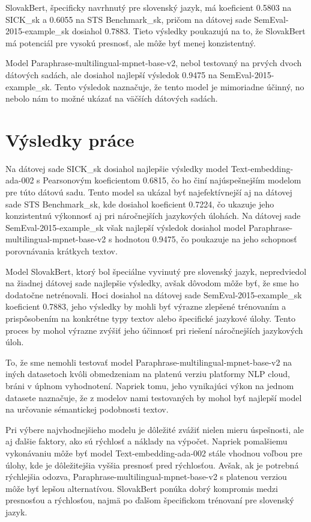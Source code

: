 \noindent
SlovakBert, špecificky navrhnutý pre slovenský jazyk, má koeficient 0.5803 na SICK\_sk a 0.6055 na STS Benchmark\_sk, pričom na dátovej sade SemEval-2015-example\_sk dosiahol 0.7883. Tieto výsledky poukazujú na to, že SlovakBert má potenciál pre vysokú presnosť, ale môže byť menej konzistentný.
\vspace{1em}

\noindent
Model Paraphrase-multilingual-mpnet-base-v2, nebol testovaný na prvých dvoch dátových sadách, ale dosiahol najlepší výsledok 0.9475 na SemEval-2015-example\_sk. Tento výsledok naznačuje, že tento model je mimoriadne účinný, no nebolo nám to možné ukázať na väčších dátových sadách.

\section{Výsledky práce}

Na dátovej sade SICK\_sk dosiahol najlepšie výsledky model Text-embedding-ada-002 s Pearsonovým koeficientom 0.6815, čo ho činí najúspešnejším modelom pre túto dátovú sadu. Tento model sa ukázal byť najefektívnejší aj na dátovej sade STS Benchmark\_sk, kde dosiahol koeficient 0.7224, čo ukazuje jeho konzistentnú výkonnosť aj pri náročnejších jazykových úlohách. Na dátovej sade SemEval-2015-example\_sk však najlepší výsledok dosiahol model Paraphrase-multilingual-mpnet-base-v2 s hodnotou 0.9475, čo poukazuje na jeho schopnosť porovnávania krátkych textov.
\vspace{1em}

\noindent
Model SlovakBert, ktorý bol špeciálne vyvinutý pre slovenský jazyk, nepredviedol na žiadnej dátovej sade najlepšie výsledky, avšak dôvodom môže byť, že sme ho dodatočne netrénovali. Hoci dosiahol na dátovej sade SemEval-2015-example\_sk koeficient 0.7883, jeho výsledky by mohli byť výrazne zlepšené trénovaním a prispôsobením na konkrétne typy textov alebo špecifické jazykové úlohy. Tento proces by mohol výrazne zvýšiť jeho účinnosť pri riešení náročnejších jazykových úloh.
\vspace{1em}

\noindent
To, že sme nemohli testovať model Paraphrase-multilingual-mpnet-base-v2 na iných datasetoch kvôli obmedzeniam na platenú verziu platformy NLP cloud, bráni v úplnom vyhodnotení. Napriek tomu, jeho vynikajúci výkon na jednom datasete naznačuje, že z modelov nami testovaných by mohol byť najlepší model na určovanie sémantickej podobnosti textov.
\vspace{1em}

\noindent
Pri výbere najvhodnejšieho modelu je dôležité zvážiť nielen mieru úspešnosti, ale aj ďalšie faktory, ako sú rýchlosť a náklady na výpočet. Napriek pomalšiemu vykonávaniu môže byť model Text-embedding-ada-002 stále vhodnou voľbou pre úlohy, kde je dôležitejšia vyššia presnosť pred rýchlosťou. Avšak, ak je potrebná rýchlejšia odozva, Paraphrase-multilingual-mpnet-base-v2 s platenou verziou môže byť lepšou alternatívou. SlovakBert ponúka dobrý kompromis medzi presnosťou a rýchlosťou, najmä po ďalšom špecifickom trénovaní pre slovenský jazyk.


